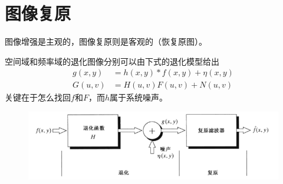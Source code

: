 
\section{图像复原} %
图像增强是主观的，图像复原则是客观的（恢复原图）。

空间域和频率域的退化图像分别可以由下式的退化模型给出
\[\begin{aligned}
g(x,y)&=h(x,y)*f(x,y)+\eta(x,y)\\
G(u,v)&=H(u,v)F(u,v)+N(u,v)
\end{aligned}\]
关键在于怎么找回$f$和$F$，而$h$属于系统噪声。

\begin{figure}[H]
\centering
\includegraphics[width=0.8\linewidth]{fig/restoration.png}
\end{figure}

